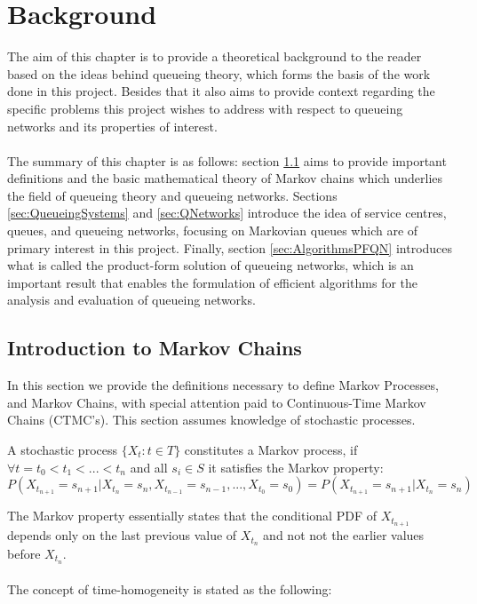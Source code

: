 \chapter{Background}

The aim of this chapter is to provide a theoretical background to the reader based on the ideas behind queueing theory, which forms the basis of the work done in this project. Besides that it also aims to provide context regarding the specific problems this project wishes to address with respect to queueing networks and its properties of interest.
\\\\
The summary of this chapter is as follows: section \ref{sec:intro_to_markov} aims to provide important definitions and the basic mathematical theory of Markov chains which underlies the field of queueing theory and queueing networks. Sections \ref{sec:QueueingSystems} and \ref{sec:QNetworks} introduce the idea of service centres, queues, and queueing networks, focusing on Markovian queues which are of primary interest in this project. Finally, section \ref{sec:AlgorithmsPFQN} introduces what is called the product-form solution of queueing networks, which is an important result that enables the formulation of efficient algorithms for the analysis and evaluation of queueing networks.

\section{Introduction to Markov Chains}\label{sec:intro_to_markov}

In this section we provide the definitions necessary to define Markov Processes, and Markov Chains, with special attention paid to Continuous-Time Markov Chains (CTMC's). This section assumes knowledge of stochastic processes.

\begin{definition}
    A stochastic process \(\{X_t : t \in T\}\) constitutes a Markov process, if \(\forall t = t_0 < t_1 < ... < t_n\) and all \(s_i \in S\) it satisfies the Markov property:
    \begin{equation}\label{eq:MarkovProperty}
        P(X_{t_{n+1}}=s_{n+1} | X_{t_n} = s_n, X_{t_{n-1}}=s_{n-1}, ... , X_{t_0}=s_0) = P(X_{t_{n+1}}=s_{n+1} | X_{t_n} = s_n)
    \end{equation}
\end{definition}

The Markov property essentially states that the conditional PDF of \(X_{t_{n+1}}\) depends only on the last previous value of \(X_{t_n}\) and not not the earlier values before \(X_{t_n}\). 
\\\\
The concept of time-homogeneity is stated as the following:

